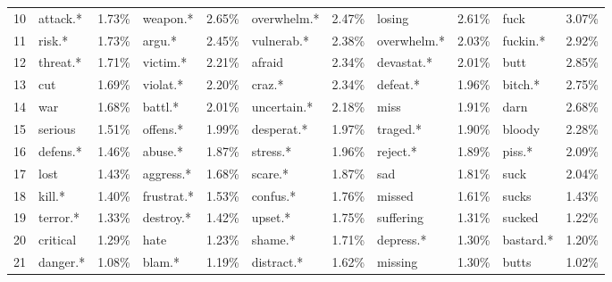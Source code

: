 \begin{tabular}{lllllllllll}
10                   &         attack.* &     1.73\% &          weapon.* &           2.65\% &  overwhelm.* &     2.47\% &        losing &     2.61\% &             fuck &            3.07\% \\
11                   &           risk.* &     1.73\% &            argu.* &           2.45\% &   vulnerab.* &     2.38\% &   overwhelm.* &     2.03\% &         fuckin.* &            2.92\% \\
12                   &         threat.* &     1.71\% &          victim.* &           2.21\% &       afraid &     2.34\% &    devastat.* &     2.01\% &             butt &            2.85\% \\
13                   &              cut &     1.69\% &          violat.* &           2.20\% &       craz.* &     2.34\% &      defeat.* &     1.96\% &          bitch.* &            2.75\% \\
14                   &              war &     1.68\% &           battl.* &           2.01\% &  uncertain.* &     2.18\% &          miss &     1.91\% &             darn &            2.68\% \\
15                   &          serious &     1.51\% &          offens.* &           1.99\% &   desperat.* &     1.97\% &      traged.* &     1.90\% &           bloody &            2.28\% \\
16                   &         defens.* &     1.46\% &           abuse.* &           1.87\% &     stress.* &     1.96\% &      reject.* &     1.89\% &           piss.* &            2.09\% \\
17                   &             lost &     1.43\% &         aggress.* &           1.68\% &      scare.* &     1.87\% &           sad &     1.81\% &             suck &            2.04\% \\
18                   &           kill.* &     1.40\% &        frustrat.* &           1.53\% &     confus.* &     1.76\% &        missed &     1.61\% &            sucks &            1.43\% \\
19                   &         terror.* &     1.33\% &         destroy.* &           1.42\% &      upset.* &     1.75\% &     suffering &     1.31\% &           sucked &            1.22\% \\
20                   &         critical &     1.29\% &              hate &           1.23\% &      shame.* &     1.71\% &     depress.* &     1.30\% &        bastard.* &            1.20\% \\
21                   &         danger.* &     1.08\% &            blam.* &           1.19\% &   distract.* &     1.62\% &       missing &     1.30\% &            butts &            1.02\% \\

\end{tabular}
